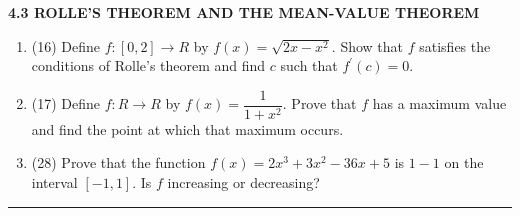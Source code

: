 \documentclass[fleqn]{article}
\begin{document}
  \textbf{4.3 ROLLE'S THEOREM AND THE MEAN-VALUE THEOREM}
  \begin{enumerate}
    \item (16) Define $f: [0, 2] \longrightarrow R$ by $f(x)=\sqrt{2x-x^2}$. Show that $f$ satisfies the conditions of Rolle's
    theorem and find $c$ such that $f^'(c)=0$.



    \item (17) Define $f: R \longrightarrow R$ by $f(x)=\dfrac{1}{1+x^2}$. Prove that $f$ has a maximum value and find the
    point at which that maximum occurs.



    \item (28) Prove that the function $f(x)=2x^3+3x^2-36x+5$ is $1-1$ on the interval $[-1,1]$. Is $f$ increasing or decreasing?



  \end{enumerate}

  \rule{15cm}{1pt}
\end{document}
